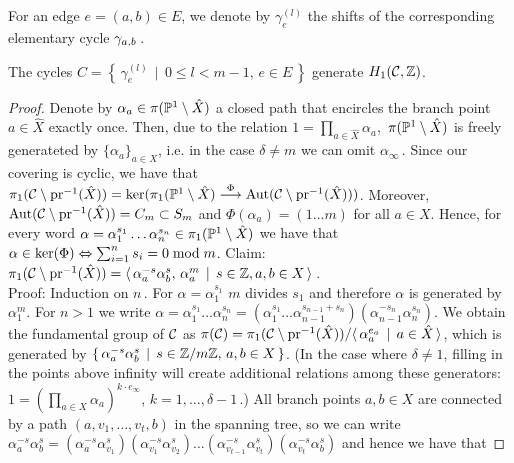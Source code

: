 \documentclass[main.tex]{subfiles}
\begin{document}
   \bigskip
  
  For an edge $e = (a,b) \in E$, we denote by $\gamma_e^{(l)}$ the shifts of the corresponding elementary cycle $\cyab$\,.
  
  \begin{thm}\label{thm:gen_set}
   The cycles $C = \left\{ \, \gamma_{e}^{(l)} \, \mid \, 0 \le l <m-1, \, e \in E \, \right\}$ generate $\homo$.
  \end{thm}
  \begin{proof}
  Denote by $\alpha_a \in \pi(\P^1 \setminus \hat{X})$ a closed path that encircles the branch point $a \in \hat{X}$ exactly once. Then,  due to the relation $1 = \prod_{a \in \hat{X}} \alpha_a$,\,
  $\pi(\P^1 \setminus \hat{X})$ is freely generateted by $\{ \alpha_a \}_{a \in X}$, i.e. in the case $\delta \ne m$ we can omit $\alpha_{\infty}$\,. \abstand
  Since our covering is cyclic, we have that $
  \pi_1(\cu \setminus \pr^{-1}(\hat{X})) = \ker(\pi_1(\P^1 \setminus \hat{X}) \overset{\Phi}{\To} \Aut(\cu \setminus \pr^{-1}(\hat{X})))$. Moreover, $\Aut(\cu \setminus \pr^{-1}(\hat{X})) = C_m 
  \subset S_m$
  and $\Phi(\alpha_a) = (1 \dots m)$ for all $a \in X$. Hence, for every word $\alpha = \alpha_1^{s_1}\dots \alpha_n^{s_n} \in \pi_1(\P^1 \setminus \hat{X})$ we have that
  $\alpha \in \ker(\Phi) \eq \sum_{i=1}^n s_i = 0 \bmod m$. \abstand
  Claim: $\pi_1(\cu \setminus \pr^{-1}(\hat{X})) = \langle \, \alpha_a^{-s} \alpha_b^{s}, \, \alpha_a^m  \, \mid \, s \in \Z, a,b \in X \, \rangle$\,. \\
  Proof: Induction on $n$\,. For $\alpha = \alpha_1^{s_1}$ $m$ divides $s_1$ and therefore $\alpha$ is generated by $\alpha_1^m$. For $n > 1$ we write
  $\alpha = \alpha_1^{s_1}\dots \alpha_n^{s_n} = (\alpha_1^{s_1} \dots \alpha_{n-1}^{s_{n-1}+s_n})(\alpha_{n-1}^{-s_n}\alpha_n^{s_n})$. \abstand
  We obtain the fundamental group of $\cu$ as
  $\pi(\cu) = \pi_1(\cu \setminus \pr^{-1}(\hat{X})) / \langle \, \alpha_a^{e_a} \, \mid \, a \in \hat{X} \, \rangle$, which is generated by 
  $\{ \, \alpha_a^{-s} \alpha_b^{s} \, \mid \, s \in \Z/m\Z, \, a,b \in X \, \}$. (In the case where $\delta \ne 1$, filling in the points above infinity will create additional relations among 
  these generators:
  $1 = (\prod_{a \in X} \alpha_a)^{k \cdot e_{\infty}}$, $k = 1,\dots,\delta-1$\,.) \abstand
  All branch points $a,b \in X$ are connected by a path $(a,v_1,\dots,v_t,b)$ in the spanning tree, so we can write $\alpha_a^{-s} \alpha_b^{s} = (\alpha_a^{-s}\alpha_{v_1}^{s})
  (\alpha_{v_1}^{-s}\alpha_{v_2}^{s})\dots(\alpha_{v_{t-1}}^{-s}\alpha_{v_t}^{s})(\alpha_{v_t}^{-s}\alpha_b^{s})$ and hence we have that 

\end{proof}
\end{document}
